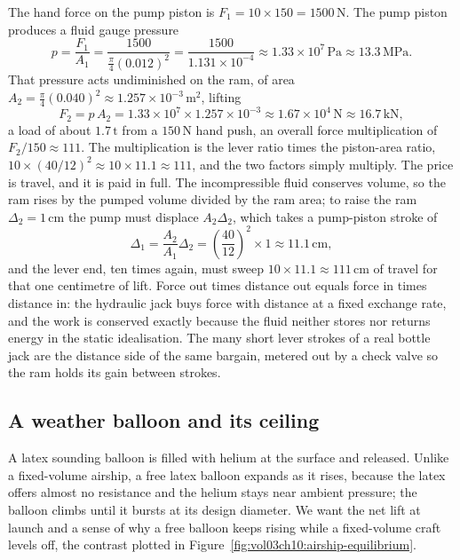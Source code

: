 The hand force on the pump piston is $F_1 = 10 \times 150 = 1500\,\text{N}$.
The pump piston produces a fluid gauge pressure
\[
p = \frac{F_1}{A_1}
= \frac{1500}{\tfrac{\pi}{4}(0.012)^2}
= \frac{1500}{1.131 \times 10^{-4}}
\approx 1.33 \times 10^7\,\text{Pa}
\approx 13.3\,\text{MPa}.
\]
That pressure acts undiminished on the ram, of area $A_2 = \tfrac{\pi}{4}
(0.040)^2 \approx 1.257 \times 10^{-3}\,\text{m}^2$, lifting
\[
F_2 = p\,A_2 = 1.33 \times 10^7 \times 1.257 \times 10^{-3}
\approx 1.67 \times 10^4\,\text{N}
\approx 16.7\,\text{kN},
\]
a load of about $1.7\,\si{\tonne}$ from a $150\,\text{N}$ hand push, an
overall force multiplication of $F_2/150 \approx 111$. The multiplication
is the lever ratio times the piston-area ratio, $10 \times (40/12)^2
\approx 10 \times 11.1 \approx 111$, and the two factors simply multiply.
The price is travel, and it is paid in full. The incompressible fluid
conserves volume, so the ram rises by the pumped volume divided by the ram
area; to raise the ram $\Delta_2 = 1\,\si{\centi\meter}$ the pump must
displace $A_2 \Delta_2$, which takes a pump-piston stroke of
\[
\Delta_1 = \frac{A_2}{A_1}\Delta_2 = \left(\frac{40}{12}\right)^2
\times 1 \approx 11.1\,\si{\centi\meter},
\]
and the lever end, ten times again, must sweep $10 \times 11.1 \approx
111\,\si{\centi\meter}$ of travel for that one centimetre of lift. Force out
times distance out equals force in times distance in: the hydraulic jack
buys force with distance at a fixed exchange rate, and the work is
conserved exactly because the fluid neither stores nor returns energy in
the static idealisation. The many short lever strokes of a real bottle jack
are the distance side of the same bargain, metered out by a check valve so
the ram holds its gain between strokes.

\subsection{A weather balloon and its ceiling}

A latex sounding balloon is filled with helium at the surface and released.
Unlike a fixed-volume airship, a free latex balloon expands as it rises,
because the latex offers almost no resistance and the helium stays near
ambient pressure; the balloon climbs until it bursts at its design
diameter. We want the net lift at launch and a sense of why a free balloon
keeps rising while a fixed-volume craft levels off, the contrast plotted in
Figure~\ref{fig:vol03ch10:airship-equilibrium}.


